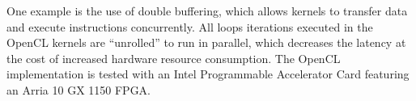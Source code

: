 \documentclass{article}
\begin{document}
One example is the use of double buffering, which allows kernels to transfer data and execute instructions concurrently.
All loops iterations executed in the OpenCL kernels are ``unrolled'' to run in parallel, which decreases the latency at the cost of increased hardware resource consumption.
The OpenCL implementation is tested with %
an Intel Programmable Accelerator Card featuring an Arria 10 GX 1150 FPGA.
\end{document}
